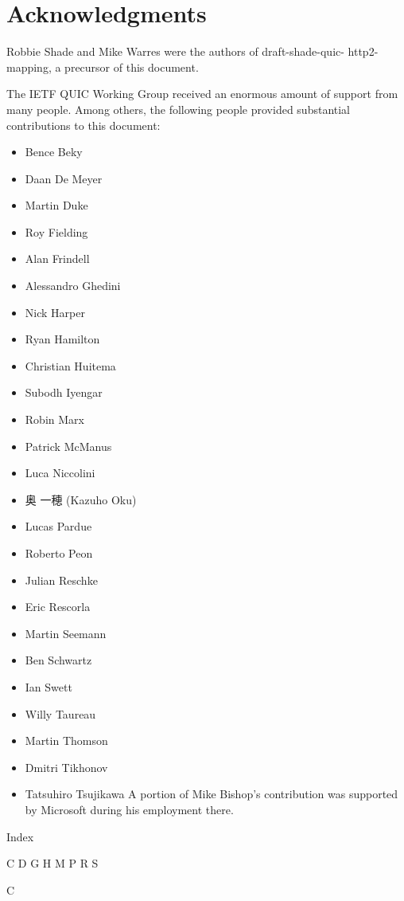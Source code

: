 \documentclass{article}
\begin{document}
\section*{Acknowledgments}

Robbie Shade and Mike Warres were the authors of draft-shade-quic- http2-mapping, a precursor of this document.

The IETF QUIC Working Group received an enormous amount of support from many people.  Among others, the following people provided substantial contributions to this document:

\begin{itemize}
\item Bence Beky
\item Daan De Meyer
\item Martin Duke
\item Roy Fielding
\item Alan Frindell
\item Alessandro Ghedini
\item Nick Harper
\item Ryan Hamilton
\item Christian Huitema
\item Subodh Iyengar
\item Robin Marx
\item Patrick McManus
\item Luca Niccolini
\item 奥 一穂 (Kazuho Oku)
\item Lucas Pardue
\item Roberto Peon
\item Julian Reschke
\item Eric Rescorla
\item Martin Seemann
\item Ben Schwartz
\item Ian Swett
\item Willy Taureau
\item Martin Thomson
\item Dmitri Tikhonov
\item Tatsuhiro Tsujikawa
A portion of Mike Bishop's contribution was supported by Microsoft during his employment there.

\end{itemize}
Index

C D G H M P R S

C
\end{document}
